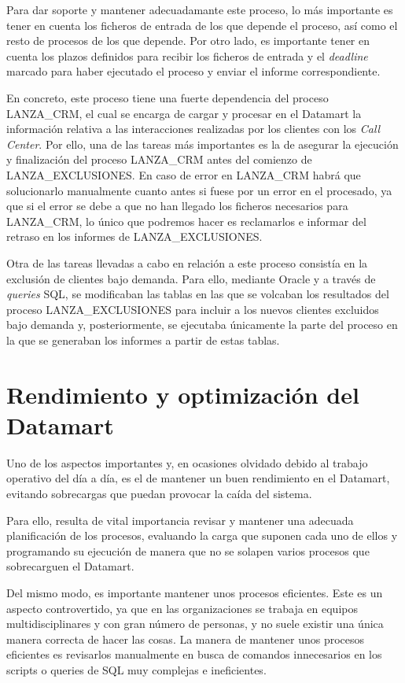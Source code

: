 \documentclass[a4paper, 12pt]{book}
\begin{document}
Para dar soporte y mantener adecuadamante este proceso, lo más importante es tener en cuenta los ficheros de entrada de los que depende el proceso, así como el resto de procesos de los que depende. Por otro lado, es importante tener en cuenta los plazos definidos para recibir los ficheros de entrada y el \textit{deadline} marcado para haber ejecutado el proceso y enviar el informe correspondiente.

En concreto, este proceso tiene una fuerte dependencia del proceso LANZA\_CRM, el cual se encarga de cargar y procesar en el Datamart la información relativa a las interacciones realizadas por los clientes con los \textit{Call Center}. Por ello, una de las tareas más importantes es la de asegurar la ejecución y finalización del proceso LANZA\_CRM antes del comienzo de LANZA\_EXCLUSIONES. En caso de error en LANZA\_CRM habrá que solucionarlo manualmente cuanto antes si fuese por un error en el procesado, ya que si el error se debe a que no han llegado los ficheros necesarios para LANZA\_CRM, lo único que podremos hacer es reclamarlos e informar del retraso en los informes de LANZA\_EXCLUSIONES.

Otra de las tareas llevadas a cabo en relación a este proceso consistía en la exclusión de clientes bajo demanda. Para ello, mediante Oracle y a través de \textit{queries} SQL, se modificaban las tablas en las que se volcaban los resultados del proceso LANZA\_EXCLUSIONES para incluir a los nuevos clientes excluidos bajo demanda y, posteriormente, se ejecutaba únicamente la parte del proceso en la que se generaban los informes a partir de estas tablas.


\section{Rendimiento y optimización del Datamart} 
\label{sec:rendimiento}
Uno de los aspectos importantes y, en ocasiones olvidado debido al trabajo operativo del día a día, es el de mantener un buen rendimiento en el Datamart, evitando sobrecargas que puedan provocar la caída del sistema.

Para ello, resulta de vital importancia revisar y mantener una adecuada planificación de los procesos, evaluando la carga que suponen cada uno de ellos y programando su ejecución de manera que no se solapen varios procesos que sobrecarguen el Datamart.

Del mismo modo, es importante mantener unos procesos eficientes. Este es un aspecto controvertido, ya que en las organizaciones se trabaja en equipos multidisciplinares y con gran número de personas, y no suele existir una única manera correcta de hacer las cosas. La manera de mantener unos procesos eficientes es revisarlos manualmente en busca de comandos innecesarios en los scripts o queries de SQL muy complejas e ineficientes.
\end{document}
